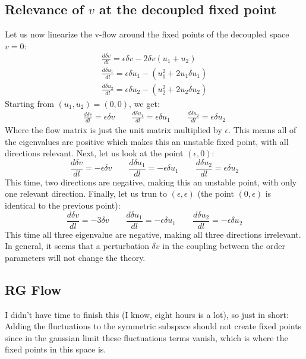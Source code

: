\documentclass{article}
\begin{document}
\subsection{Relevance of $v$ at the decoupled fixed point}
Let us now linearize the v-flow around the fixed points of the decoupled space $v = 0$:
\begin{equation}
\begin{gathered}
    \frac{d\delta v}{dl} = \epsilon \delta v - 2\delta v(u_1 + u_2)
    \\
    \frac{d\delta u_1}{dl} = \epsilon \delta u_1 - (u_1^2 + 2u_1\delta u_1)
    \\
    \frac{d\delta u_2}{dl} = \epsilon \delta u_2 - (u_2^2 + 2u_2 \delta u_2)
\end{gathered}
\end{equation}
Starting from $(u_1, u_2) = (0, 0)$, we get:
\begin{equation}
\begin{gathered}
    \frac{d\delta v}{dl} = \epsilon \delta v
    \qquad
    \frac{d\delta u_1}{dl} = \epsilon \delta u_1
    \qquad
    \frac{d\delta u_2}{dl} = \epsilon \delta u_2
\end{gathered}
\end{equation}
Where the flow matrix is just the unit matrix multiplied by $\epsilon$. This means all of the eigenvalues are positive which makes this an unstable fixed point, with all directions relevant. Next, let us look at the point $(\epsilon, 0)$:
\begin{equation}
    \frac{d\delta v}{dl} = - \epsilon\delta v
    \qquad
    \frac{d\delta u_1}{dl} = - \epsilon\delta u_1
    \qquad
    \frac{d\delta u_2}{dl} = \epsilon \delta u_2
\end{equation}
This time, two directions are negative, making this an unstable point, with only one relevant direction.
Finally, let us trun to $(\epsilon, \epsilon)$ (the point $(0,\epsilon)$ is identical to the previous point):
\begin{equation}
    \frac{d\delta v}{dl} = -3\delta v
    \qquad
    \frac{d\delta u_1}{dl} = -\epsilon \delta u_1
    \qquad
    \frac{d\delta u_2}{dl} = -\epsilon \delta u_2
\end{equation}
This time all three eigenvalue are negative, making all three directions irrelevant.
\newline
In general, it seems that a perturbation $\delta v$ in the coupling between the order parameters will not change the theory.
\subsection{RG Flow}
I didn't have time to finish this (I know, eight hours is a lot), so just in short:
Adding the fluctuations to the symmetric subspace should not create fixed points since in the gaussian limit these fluctuations terms vanish, which is where the fixed points in this space is.
\end{document}
